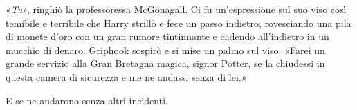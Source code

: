 «\textit{Tu}», ringhiò la professoressa McGonagall. Ci fu un’espressione sul suo viso così temibile e terribile che Harry strillò e fece un passo indietro, rovesciando una pila di monete d’oro con un gran rumore tintinnante e cadendo all’indietro in un mucchio di denaro. Griphook sospirò e si mise un palmo sul viso. «Farei un grande servizio alla Gran Bretagna magica, signor Potter, se la chiudessi in questa camera di sicurezza e me ne andassi senza di lei.»

E se ne andarono senza altri incidenti.
